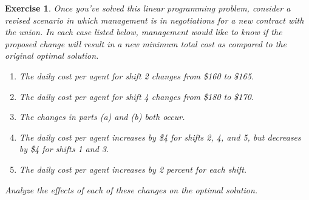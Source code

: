 \documentclass[letterpaper,10pt]{article}
\newtheorem{ex}{Exercise}
\begin{document}
\begin{ex}
Once you've solved this linear programming problem, consider a revised scenario in which management is in negotiations for a new contract with the union.  In each case listed below, management would like to know if the proposed change will result in a new minimum total cost as compared to the original optimal solution.

\begin{enumerate}

\item[(a)] The daily cost per agent for shift 2 changes from \$160 to \$165.

\item[(b)] The daily cost per agent for shift 4 changes from \$180 to \$170.

\item[(c)] The changes in parts (a) and (b) both occur.

\item[(d)] The daily cost per agent increases by \$4 for shifts 2, 4, and 5, but decreases by \$4 for shifts 1 and 3.

\item[(e)] The daily cost per agent increases by 2 percent for each shift.

\end{enumerate}

Analyze the effects of each of these changes on the optimal solution.

\end{ex}
\end{document}
